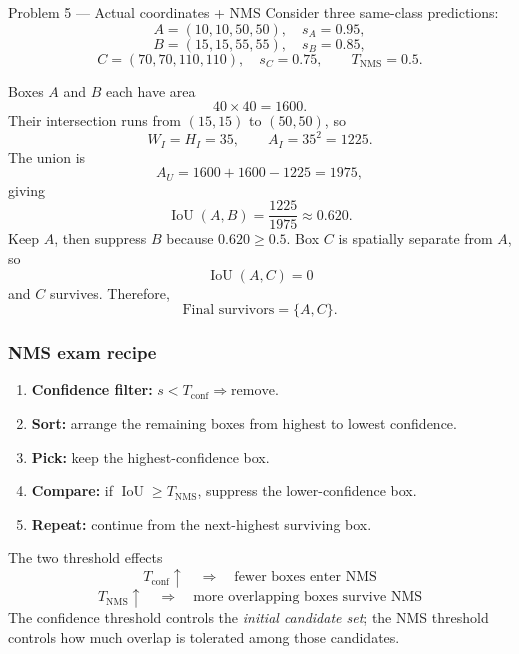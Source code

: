 \documentclass[11pt]{article}
\begin{document}
\begin{practicebox}{Problem 5 --- Actual coordinates + NMS}
Consider three same-class predictions:
\[
A=(10,10,50,50),\quad s_A=0.95,
\]
\[
B=(15,15,55,55),\quad s_B=0.85,
\]
\[
C=(70,70,110,110),\quad s_C=0.75,
\qquad
T_{\mathrm{NMS}}=0.5.
\]

Boxes \(A\) and \(B\) each have area
\[
40\times40=1600.
\]
Their intersection runs from \((15,15)\) to \((50,50)\), so
\[
W_I=H_I=35,
\qquad
A_I=35^2=1225.
\]
The union is
\[
A_U=1600+1600-1225=1975,
\]
giving
\[
\boxed{
\operatorname{IoU}(A,B)=\frac{1225}{1975}\approx0.620
}.
\]
Keep \(A\), then suppress \(B\) because \(0.620\geq0.5\). Box \(C\) is spatially separate from \(A\), so
\[
\operatorname{IoU}(A,C)=0
\]
and \(C\) survives. Therefore,
\[
\boxed{\text{Final survivors}=\{A,C\}}.
\]
\end{practicebox}

\subsubsection{NMS exam recipe}

\begin{focusbox}
\begin{enumerate}[label=\textbf{\arabic*.},leftmargin=*,align=left,nosep]
  \item \textbf{Confidence filter:} \(s<T_{\mathrm{conf}}\Rightarrow\text{remove}\).
  \item \textbf{Sort:} arrange the remaining boxes from highest to lowest confidence.
  \item \textbf{Pick:} keep the highest-confidence box.
  \item \textbf{Compare:} if \(\operatorname{IoU}\geq T_{\mathrm{NMS}}\), suppress the lower-confidence box.
  \item \textbf{Repeat:} continue from the next-highest surviving box.
\end{enumerate}
\end{focusbox}

\begin{prioritybox}{The two threshold effects}
\[
\boxed{
T_{\mathrm{conf}}\uparrow
\quad\Longrightarrow\quad
\text{fewer boxes enter NMS}
}
\]
\[
\boxed{
T_{\mathrm{NMS}}\uparrow
\quad\Longrightarrow\quad
\text{more overlapping boxes survive NMS}
}
\]
The confidence threshold controls the \emph{initial candidate set}; the NMS threshold controls how much overlap is tolerated among those candidates.
\end{prioritybox}
\end{document}
